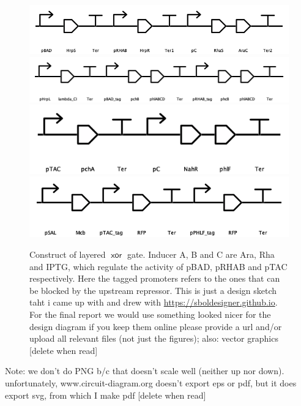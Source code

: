 \documentclass[12pt,notitlepage]{article}
\newcommand{\XOR}{\ensuremath{\mathop{\mathsf{xor}}}\xspace}
\newcommand{\hh}[1]{{\color{Purple}#1}}
\newcommand{\ra}[1]{{\color{Blue}#1}}
\begin{document}
\begin{figure}
    \centering
    \includegraphics[width = \linewidth]{gene_circuits_xor/P1.png}
    \includegraphics[width = \linewidth]{gene_circuits_xor/P2.png}
    \includegraphics[width = \linewidth]{gene_circuits_xor/P3.png}
    \includegraphics[width = \linewidth]{gene_circuits_xor/P4.png}
    \caption{Construct of layered \XOR gate. Inducer A, B and C are Ara, Rha and IPTG, which regulate the activity of pBAD, pRHAB and pTAC respectively. Here the tagged promoters refers to the ones that can be blocked by the upstream repressor. \hh{This is just a design sketch taht i came up with and drew with \url{https://sboldesigner.github.io}. For the final report we would use something looked nicer for the design diagram}
    \ra{if you keep them online please provide a url and/or upload all relevant files (not just the figures); also: vector graphics [delete when read]}
    }
    \label{f:gene_circuit_xor}
\end{figure}


\ra{Note: we don't do PNG b/c that doesn't scale well (neither up nor down). unfortunately, www.circuit-diagram.org doesn't export eps or pdf, but it does export svg, from which I make pdf [delete when read]}
\end{document}
